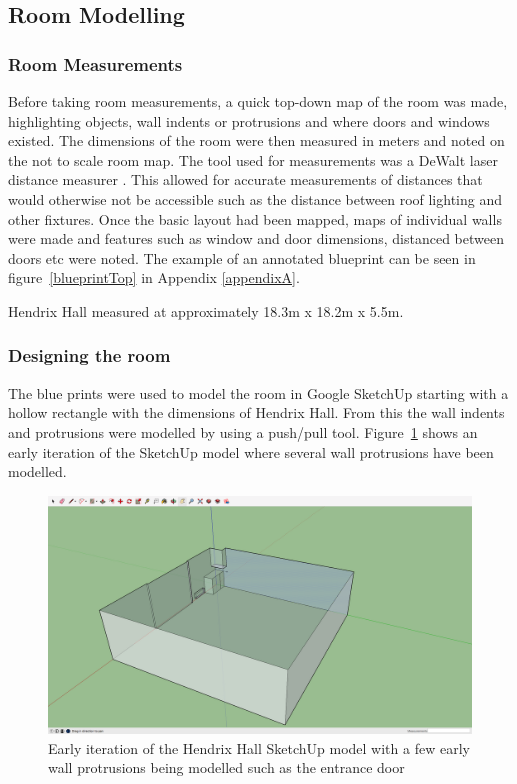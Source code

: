 \documentclass[../../main.tex]{subfiles}
\begin{document}
	\subsection{Room Modelling}

		\subsubsection{Room Measurements}

			Before taking room measurements, a quick top-down map of the room was made, highlighting objects, wall indents or protrusions and where doors and windows existed. The dimensions of the room were then measured in meters and noted on the not to scale room map. The tool used for measurements was a DeWalt laser distance measurer \cite{dewalt}. This allowed for accurate measurements of distances that would otherwise not be accessible such as the distance between roof lighting and other fixtures. Once the basic layout had been mapped, maps of individual walls were made and features such as window and door dimensions, distanced between doors etc were noted. The example of an annotated blueprint can be seen in figure~\ref{blueprintTop} in Appendix \ref{appendixA}.

			Hendrix Hall measured at approximately 18.3m x 18.2m x 5.5m.

		\subsubsection{Designing the room}
			\label{designRoom}
			The blue prints were used to model the room in Google SketchUp starting with a hollow rectangle with the dimensions of Hendrix Hall. From this the wall indents and protrusions were modelled by using a push/pull tool. Figure~\ref{sku1} shows an early iteration of the SketchUp model where several wall protrusions have been modelled.

			\begin{figure}[ht]
				\center\includegraphics[scale = 0.2]{Sections/Implementation/Modelling/images/sku1.png}
				\caption{Early iteration of the Hendrix Hall SketchUp model with a few early wall protrusions being modelled such as the entrance door}
				\label{sku1}
			\end{figure}
\end{document}
